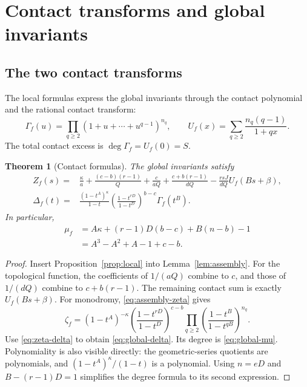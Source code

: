 \documentclass[11pt]{article}
\numberwithin{equation}{section}
\newtheorem{theorem}{Theorem}[section]
\theoremstyle{definition}
\theoremstyle{remark}
\begin{document}
\section{Contact transforms and global invariants}\label{sec:global}

\subsection{The two contact transforms}

The local formulas express the global invariants through the
contact polynomial and the rational contact transform:
\begin{equation}\label{eq:contact-transforms}
 \Gamma_f(u)=\prod_{q\ge2}(1+u+\cdots+u^{q-1})^{n_q},
 \qquad
 U_f(x)=\sum_{q\ge2}\frac{n_q(q-1)}{1+qx}.
\end{equation}
The total contact excess is
$\deg\Gamma_f=U_f(0)=S$.

\begin{theorem}[Contact formulas]\label{thm:formulas}
The global invariants satisfy
\begin{align}
 Z_f(s)={}&\frac{\kappa}{a}
       +\frac{(c-b)(r-1)}Q+\frac{c}{aQ}
       +\frac{c+b(r-1)}{dQ}
       -\frac{rsJ}{dQ}U_f(Bs+\beta),\label{eq:global-z}\\
 \Delta_f(t)={}&\frac{(1-t^A)^\kappa}{1-t}
       \left(\frac{1-t^{rD}}{1-t^D}\right)^{b-c}
       \Gamma_f(t^B).\label{eq:global-delta}
\end{align}
In particular,
\begin{equation}\label{eq:global-mu}
 \begin{aligned}
 \mu_f&=A\kappa+(r-1)D(b-c)+B(n-b)-1\\
      &=A^3-A^2+A-1+c-b.
 \end{aligned}
\end{equation}
\end{theorem}

\begin{proof}
Insert Proposition~\ref{prop:local} into
Lemma~\ref{lem:assembly}. For the topological function, the
coefficients of $1/(aQ)$ combine to $c$, and those of $1/(dQ)$
combine to $c+b(r-1)$. The remaining contact sum is exactly
$U_f(Bs+\beta)$. For monodromy, \eqref{eq:assembly-zeta} gives
\[
 \zeta_f=(1-t^A)^{-\kappa}
  \left(\frac{1-t^{rD}}{1-t^D}\right)^{c-b}
  \prod_{q\ge2}
       \left(\frac{1-t^B}{1-t^{qB}}\right)^{n_q}.
\]
Use \eqref{eq:zeta-delta} to obtain \eqref{eq:global-delta}.
Its degree is \eqref{eq:global-mu}. Polynomiality is also
visible directly: the geometric-series quotients are
polynomials, and $(1-t^A)^\kappa/(1-t)$ is a polynomial.
Using $n=eD$ and $B-(r-1)D=1$ simplifies the degree formula
to its second expression.
\end{proof}
\end{document}
